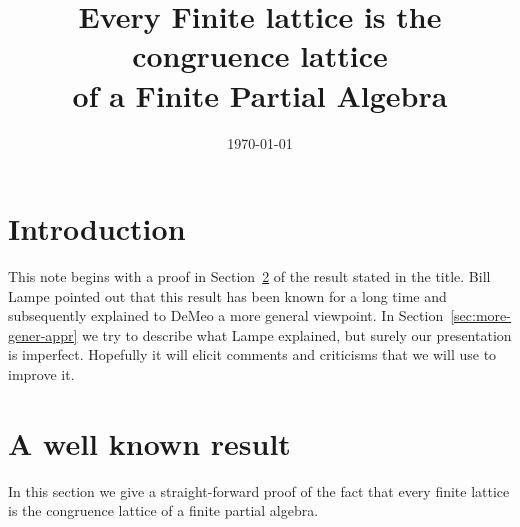
\usepackage{inputs/proof-dashed}



\usepackage{inputs/macros}

\usepackage[backend=bibtex]{biblatex}




\title[Partial Algebras]{Every Finite lattice is the congruence lattice\\
of a Finite Partial Algebra}
\date{\today}
\address{University of Hawaii}
\address{Chapman University}


\maketitle


\section{Introduction}
\label{sec:introduction}
This note begins with a proof in Section~\ref{sec:simple-proof-well} of the
result stated in the title. Bill Lampe pointed out that this result has been
known for a long time and subsequently explained to DeMeo a more general
viewpoint.  In Section~\ref{sec:more-gener-appr}
we try to describe what Lampe explained, but 
surely our presentation is imperfect.  Hopefully it will elicit comments and
criticisms that we will use to improve it.

\section{A well known result}
\label{sec:simple-proof-well}
In this section we give a straight-forward proof of the fact that every finite
lattice is the congruence lattice of a finite partial algebra.



